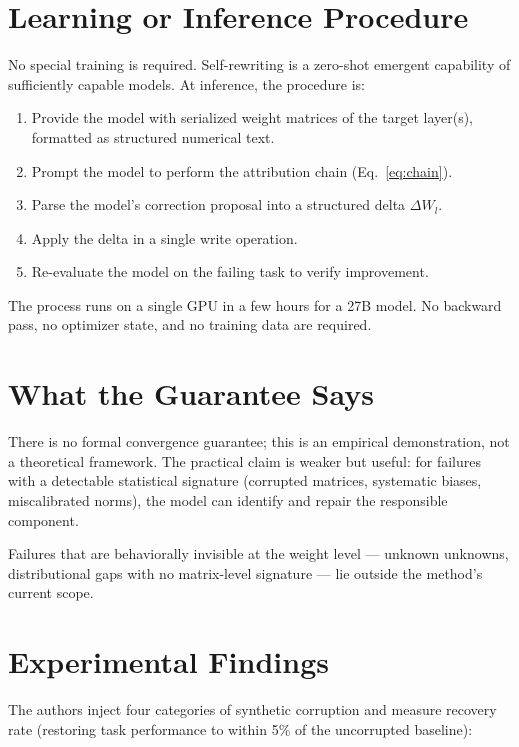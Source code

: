 \documentclass[10pt,twocolumn]{article}
\begin{document}
\section{Learning or Inference Procedure}

No special training is required.
Self-rewriting is a zero-shot emergent capability of sufficiently capable models.
At inference, the procedure is:

\begin{enumerate}[leftmargin=1.5em,itemsep=1pt]
  \item Provide the model with serialized weight matrices of the target layer(s), formatted as structured numerical text.
  \item Prompt the model to perform the attribution chain (Eq.~\ref{eq:chain}).
  \item Parse the model's correction proposal into a structured delta $\Delta W_l$.
  \item Apply the delta in a single write operation.
  \item Re-evaluate the model on the failing task to verify improvement.
\end{enumerate}

The process runs on a single GPU in a few hours for a 27B model.
No backward pass, no optimizer state, and no training data are required.

\section{What the Guarantee Says}

There is no formal convergence guarantee; this is an empirical demonstration, not a theoretical framework.
The practical claim is weaker but useful: for failures with a detectable statistical signature (corrupted matrices, systematic biases, miscalibrated norms), the model can identify and repair the responsible component.

Failures that are behaviorally invisible at the weight level --- unknown unknowns, distributional gaps with no matrix-level signature --- lie outside the method's current scope.

\section{Experimental Findings}

The authors inject four categories of synthetic corruption and measure recovery rate (restoring task performance to within 5\% of the uncorrupted baseline):
\end{document}
